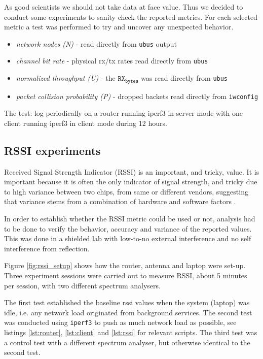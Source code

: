 As good scientists we should not take data at face value. Thus we decided to
conduct some experiments to sanity check the reported metrics. For each
selected metric a test was performed to try and uncover any unexpected
behavior.

\begin{itemize}

    \item \emph{network nodes (N)} - read directly from \texttt{ubus} output

    \item \emph{channel bit rate} - physical rx/tx rates read directly from \texttt{ubus}

    \item \emph{normalized throughput (U)} - the $\texttt{RX}_\texttt{bytes}$ was read directly from \texttt{ubus}

    \item \emph{packet collision probability (P)} - dropped backets read directly from \texttt{iwconfig}

\end{itemize}

The test: log periodically on a router running iperf3 in server mode with one client
running iperf3 in client mode during 12 hours.


\subsection{RSSI experiments}

Received Signal Strength Indicator (RSSI) is an important, and tricky, value. It
is important because it is often the only indicator of signal strength, and
tricky due to high variance between two chips, from same or different vendors,
suggesting that variance stems from a combination of hardware and software
factors \cite{lui}.

In order to establish whether the RSSI metric could be used or not, analysis had
to be done to verify the behavior, accuracy and variance of the reported values.
This was done in a shielded lab with low-to-no external interference and no self
interference from reflection.

Figure \ref{fig:rssi_setup} shows how the router, antenna and laptop were
set-up. Three experiment sessions were carried out to measure RSSI, about 5
minutes per session, with two different spectrum analysers.

The first test established the baseline rssi values when the system (laptop) was
idle, i.e. any network load originated from background services. The second test
was conducted using \texttt{iperf3} to push as much network load as possible,
see listings \ref{lst:router}, \ref{lst:client} and \ref{lst:rssi} for relevant
scripts. The third test was a control test with a different spectrum analyser,
but otherwise identical to the second test.

